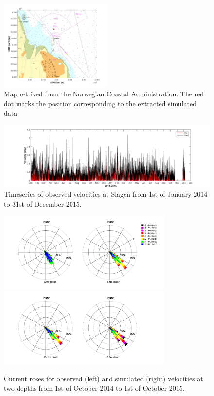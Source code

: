 \documentclass[12pt,a4paper,english]{article}
\begin{document}
\begin{figure}[ht]
\centerline{
\includegraphics*[trim=1cm 0cm 1cm 0cm,clip=true,width=0.5\textwidth]{Figurer/Slagen_kart}}
\caption{\small
Map retrived from the Norwegian Coastal Administration. The red dot marks the position corresponding to the extracted simulated data.}
\label{fig:Slagen-kart}
\end{figure}

\begin{figure}[ht]
\centerline{
\includegraphics*[trim=3cm 0cm 3cm 0cm,clip=true,width=\textwidth]{Figurer/Slagen_tid}}
\caption{\small
Timeseries of observed velocities at Slagen from 1st of January 2014 to 31st of December 2015.}
\label{fig:Slagen-tid}
\end{figure}

\begin{figure}[ht]
\centerline{
\includegraphics*[trim=2cm 1cm 1cm 0cm,clip=true,height=4cm]{Figurer/Slagen_Rose_obs} 
\includegraphics*[trim=2cm 1cm 3cm 0cm,clip=true,height=4cm]{Figurer/Slagen_Rose_sim}
}
\caption{\small
Current roses for observed (left) and simulated (right) velocities at two depths from 1st of October 2014 to 1st of October 2015.}
\label{fig:Slagen-rose}
\end{figure}
\end{document}
